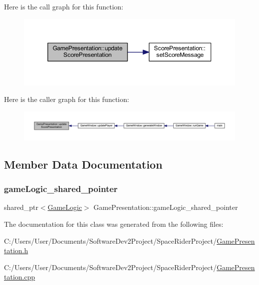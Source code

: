 Here is the call graph for this function\+:\nopagebreak
\begin{figure}[H]
\begin{center}
\leavevmode
\includegraphics[width=350pt]{class_game_presentation_ab2cf74842583bf5b63e5973fb8b657be_cgraph}
\end{center}
\end{figure}
Here is the caller graph for this function\+:\nopagebreak
\begin{figure}[H]
\begin{center}
\leavevmode
\includegraphics[width=350pt]{class_game_presentation_ab2cf74842583bf5b63e5973fb8b657be_icgraph}
\end{center}
\end{figure}


\subsection{Member Data Documentation}
\mbox{\label{class_game_presentation_a2f149f73bdd87ded8a6d66ecc427352f}} 
\subsubsection{\texorpdfstring{game\+Logic\+\_\+shared\+\_\+pointer}{gameLogic\_shared\_pointer}}
{\footnotesize\ttfamily shared\+\_\+ptr$<$\hyperlink{class_game_logic}{Game\+Logic}$>$ Game\+Presentation\+::game\+Logic\+\_\+shared\+\_\+pointer}



The documentation for this class was generated from the following files\+:\begin{DoxyCompactItemize}
\item 
C\+:/\+Users/\+User/\+Documents/\+Software\+Dev2\+Project/\+Space\+Rider\+Project/\hyperlink{_game_presentation_8h}{Game\+Presentation.\+h}\item 
C\+:/\+Users/\+User/\+Documents/\+Software\+Dev2\+Project/\+Space\+Rider\+Project/\hyperlink{_game_presentation_8cpp}{Game\+Presentation.\+cpp}\end{DoxyCompactItemize}
